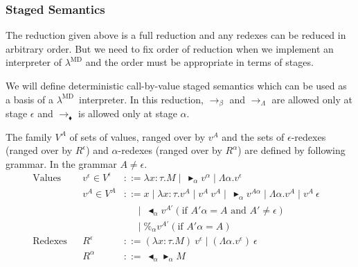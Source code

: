 \documentclass[runningheads]{llncs}
\newcommand{\LMD}{$\lambda^{\textrm{MD}}$\xspace}
\newcommand{\TB}{\blacktriangleright}
\newcommand{\TBL}{\blacktriangleleft}
\begin{document}
  \subsubsection{Staged Semantics}

  The reduction given above is a full reduction and any redexes can be reduced in arbitrary order.
  But we need to fix order of reduction when we implement an interpreter of \LMD and
  the order must be appropriate in terms of stages.

  We will define deterministic call-by-value staged semantics which can be used as a basis of a \LMD\ interpreter.
  In this reduction, $\longrightarrow_\beta$ and $\longrightarrow_\Lambda$ are allowed only at stage $\epsilon$ and 
  $\longrightarrow_\blacklozenge$ is allowed only at stage $\alpha$.

  \begin{definition}[Values]
      The family $V^A$ of sets of values, ranged over by $v^A$ and 
      the sets of $\epsilon$-redexes (ranged over by $R^\epsilon$) and $\alpha$-redexes (ranged over by $R^\alpha$)
      are defined by following grammar. In the grammar $A \neq \epsilon$.
      \begin{align*}
          \textrm{Values}  &   & v^\epsilon \in V^\epsilon & ::= \lambda x:\tau.M \mid\ \TB_\alpha v^\alpha \mid \Lambda\alpha.v^\epsilon                                       &   \\
                           &   & v^A \in V^A               & ::= x \mid \lambda x:\tau.v^A \mid v^A\ v^A \mid\ \TB_\alpha v^{A\alpha} \mid \Lambda\alpha.v^A \mid v^A\ \epsilon &   \\
                           &   &                           & \quad\   \mid\ \TBL_\alpha v^{A'} (\text{if } A'\alpha = A \text{ and } A' \neq \epsilon)                          &   \\
                           &   &                           & \quad\   \mid \%_\alpha v^{A'} (\text{if } A'\alpha = A)                                                           &   \\
          \textrm{Redexes} &   & R^\epsilon                & ::= (\lambda x:\tau.M)\ v^\epsilon \mid (\Lambda\alpha.v^\epsilon)\ \epsilon                                       &   \\
                           &   & R^\alpha                  & ::=\ \TBL_\alpha \TB_\alpha M                                                                                      &   \\
      \end{align*}
  \end{definition}
\end{document}
